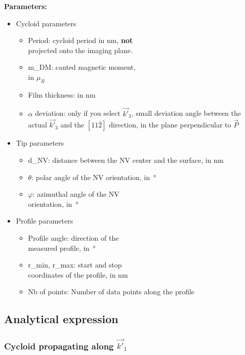\documentclass[a4paper,12pt]{article}
\begin{document}
\textbf{Parameters:}
\begin{itemize}
\item Cycloid parameters
  \begin{itemize}
  \item Period: cycloid period in \si{\nano\meter}, \textbf{not}\\ projected onto the imaging plane.
  \item m\_DM: canted magnetic moment,\\ in $\mu_B$
  \item Film thickness: in \si{\nano\meter}
  \item $\alpha$ deviation: only if you select $\vec{k'}_3$, small deviation angle between the\\ actual $\vec{k'}_3$ and the $[11\bar{2}]$ direction, in the plane perpendicular to $\vec{P}$
  \end{itemize}
\item Tip parameters
  \begin{itemize}
  \item d\_NV: distance between the NV center and the surface, in \si{\nano\meter}
  \item $\theta$: polar angle of the NV orientation, in~°
  \item $\varphi$: azimuthal angle of the NV\\ orientation, in~°
  \end{itemize}
\item Profile parameters
  \begin{itemize}
  \item Profile angle: direction of the\\ measured profile, in~°
  \item r\_min, r\_max: start and stop \\coordinates of the profile, in \si{\nano\meter}
  \item Nb of points: Number of data points along the profile
  \end{itemize}
\end{itemize}

\subsection{Analytical expression}

\subsubsection{Cycloid propagating along $\vec{k'}_1$}
\end{document}
